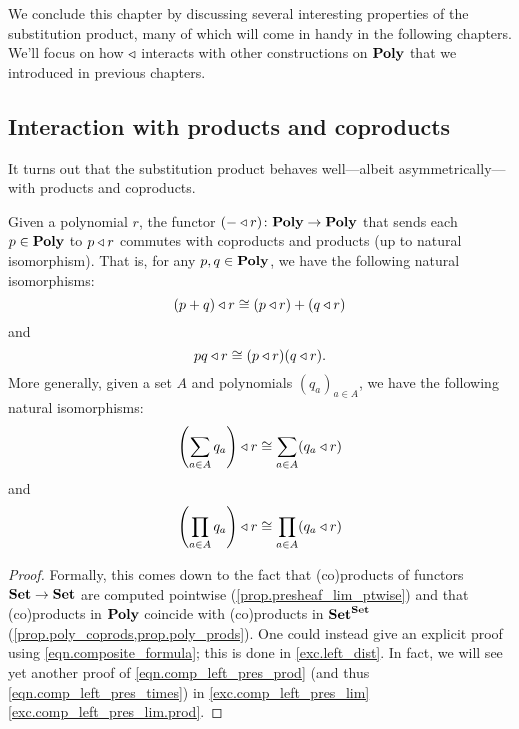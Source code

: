 \documentclass[Book-Poly]{subfiles}
\begin{document}
We conclude this chapter by discussing several interesting properties of the substitution product, many of which will come in handy in the following chapters.
We'll focus on how $\mathbin{\triangleleft}$ interacts with other constructions on $\mathbf{Poly}$ that we introduced in previous chapters.

\subsection{Interaction with products and coproducts} \label{subsec.comon.comp.prop.prod}

It turns out that the substitution product behaves well---albeit asymmetrically---with products and coproducts.

\begin{proposition}\label{prop.left_dist_prod}
Given a polynomial $r$, the functor $(-\mathbin{\triangleleft} r)\colon\mathbf{Poly}\to\mathbf{Poly}$ that sends each $p\in\mathbf{Poly}$ to $p\mathbin{\triangleleft} r$ commutes with coproducts and products (up to natural isomorphism).
That is, for any $p,q\in\mathbf{Poly}$, we have the following natural isomorphisms:
\begin{equation}\label{eqn.comp_left_pres_plus}
    (p+q)\mathbin{\triangleleft} r\cong (p\mathbin{\triangleleft} r)+(q\mathbin{\triangleleft} r)
\end{equation}
and
\begin{equation}\label{eqn.comp_left_pres_times}
    pq\mathbin{\triangleleft} r\cong (p\mathbin{\triangleleft} r)(q\mathbin{\triangleleft} r).
\end{equation}
More generally, given a set $A$ and polynomials $(q_a)_{a\in A}$, we have the following natural isomorphisms:
\begin{equation}\label{eqn.comp_left_pres_sum}
    \left(\sum_{a\in A}q_a\right)\mathbin{\triangleleft} r\cong \sum_{a\in A} (q_a\mathbin{\triangleleft} r)
\end{equation}
and
\begin{equation}\label{eqn.comp_left_pres_prod}
    \left(\prod_{a\in A}q_a\right)\mathbin{\triangleleft} r\cong \prod_{a\in A} (q_a\mathbin{\triangleleft} r)
\end{equation}
\end{proposition}
\begin{proof}
Formally, this comes down to the fact that (co)products of functors $\mathbf{Set}\to\mathbf{Set}$ are computed pointwise (\cref{prop.presheaf_lim_ptwise}) and that (co)products in $\mathbf{Poly}$ coincide with (co)products in $\mathbf{Set}^{\mathbf{Set}}$ (\cref{prop.poly_coprods,prop.poly_prods}).
One could instead give an explicit proof using \eqref{eqn.composite_formula}; this is done in \cref{exc.left_dist}.
In fact, we will see yet another proof of \eqref{eqn.comp_left_pres_prod} (and thus \eqref{eqn.comp_left_pres_times}) in \cref{exc.comp_left_pres_lim} \cref{exc.comp_left_pres_lim.prod}.
\end{proof}
\end{document}

